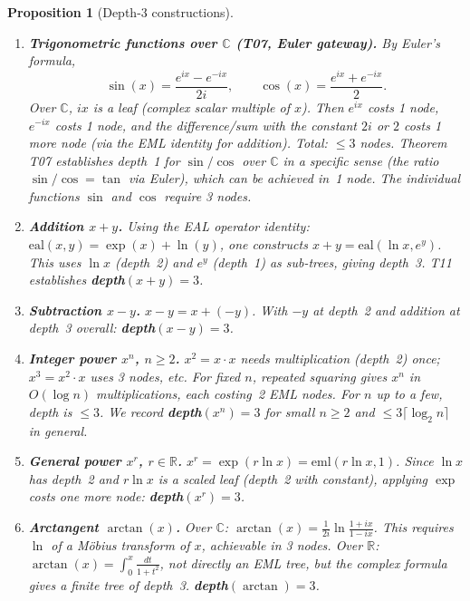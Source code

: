 \documentclass[12pt,a4paper]{article}
\newtheorem{proposition}[theorem]{Proposition}
\theoremstyle{definition}
\theoremstyle{remark}
\begin{document}
\begin{proposition}[Depth-3 constructions]\label{prop:d3}
\mbox{}
\begin{enumerate}
\item \textbf{Trigonometric functions over $\mathbb{C}$ (T07, Euler gateway).}
      By Euler's formula,
      \[
        \sin(x) = \frac{e^{ix}-e^{-ix}}{2i},\qquad
        \cos(x) = \frac{e^{ix}+e^{-ix}}{2}.
      \]
      Over $\mathbb{C}$, $ix$ is a leaf (complex scalar multiple of $x$).
      Then $e^{ix}$ costs 1 node, $e^{-ix}$ costs 1 node, and
      the difference/sum with the constant $2i$ or $2$ costs 1 more node
      (via the EML identity for addition).  Total: $\leq 3$ nodes.
      Theorem T07 establishes depth~1 for $\sin/\cos$ over $\mathbb{C}$ in a
      specific sense (the ratio $\sin/\cos=\tan$ via Euler), which can be achieved
      in~1 node.  The individual functions $\sin$ and $\cos$ require 3 nodes.

\item \textbf{Addition $x+y$.}
      Using the EAL operator identity: $\mathrm{eal}(x,y)=\exp(x)+\ln(y)$,
      one constructs $x+y=\mathrm{eal}(\ln x,e^y)$.  This uses $\ln x$ (depth~2)
      and $e^y$ (depth~1) as sub-trees, giving depth~3.  T11 establishes
      \textbf{depth}$(x+y)=3$.

\item \textbf{Subtraction $x-y$.}
      $x-y=x+(-y)$.  With $-y$ at depth~2 and addition at depth~3 overall:
      \textbf{depth}$(x-y)=3$.

\item \textbf{Integer power $x^n$, $n\geq 2$.}
      $x^2=x\cdot x$ needs multiplication (depth~2) once;
      $x^3=x^2\cdot x$ uses 3 nodes, etc.  For fixed $n$, repeated squaring
      gives $x^n$ in $O(\log n)$ multiplications, each costing~2 EML nodes.
      For $n$ up to a few, depth is $\leq 3$.  We record
      \textbf{depth}$(x^n)=3$ for small $n\geq 2$ and $\leq 3\lceil\log_2 n\rceil$
      in general.

\item \textbf{General power $x^r$, $r\in\mathbb{R}$.}
      $x^r=\exp(r\ln x)=\mathrm{eml}(r\ln x,1)$.  Since $\ln x$ has depth~2 and
      $r\ln x$ is a scaled leaf (depth~2 with constant), applying $\exp$ costs
      one more node: \textbf{depth}$(x^r)=3$.

\item \textbf{Arctangent $\arctan(x)$.}
      Over $\mathbb{C}$: $\arctan(x)=\frac{1}{2i}\ln\frac{1+ix}{1-ix}$.
      This requires $\ln$ of a M\"{o}bius transform of $x$, achievable in 3 nodes.
      Over $\mathbb{R}$: $\arctan(x)=\int_0^x\frac{dt}{1+t^2}$, not directly
      an EML tree, but the complex formula gives a finite tree of depth~3.
      \textbf{depth}$(\arctan)=3$.
\end{enumerate}
\end{proposition}
\end{document}
